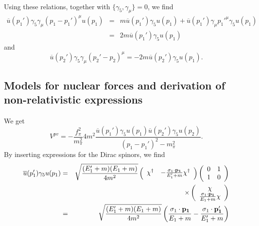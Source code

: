 \documentclass[%
twoside,                 %
final,                   %
10pt]{article}
\begin{document}
\paragraph{}
Using these relations, together with $\{\gamma_{5},\gamma_{\mu}\}=0$, we find 
\begin{eqnarray*}
\overline{u}(p_{1}')\gamma_{5}\gamma_{\mu}(p_{1}-p_{1}')^{\mu}u(p_{1})
&=&m\overline{u}(p_{1}')\gamma_{5}u(p_{1})+\overline{u}(p_{1}')\gamma_{\mu}
p_{1}'^{\mu}\gamma_{5}u(p_{1}) \nonumber \\
 &=&2m\overline{u}(p_{1}')\gamma_{5}u(p_{1}) \nonumber
\end{eqnarray*}
and 
\[
\overline{u}(p_{2}')\gamma_{5}\gamma_{\mu}(p_{2}'-p_{2})^{\mu}=
-2m\overline{u}(p_{2}')\gamma_{5}u(p_{1}).
\]



\subsection*{Models for nuclear forces and derivation of non-relativistic expressions}

\paragraph{}
We get
\[
V^{pv}=-\frac{f_{\pi}^{2}}{m_{\pi}^{2}}4m^{2}\frac{\overline{u}(p_{1}')
\gamma_{5}u(p_{1})\overline{u}(p_{2}')\gamma_{5}u(p_{2})}{(p_{1}-p_{1}')
^{2}-m_{\pi}^{2}}.
\]
By inserting expressions for the Dirac spinors, we find
\begin{eqnarray*}
\overline{u}(p_{1}')\gamma_{5}u(p_{1})&=&\sqrt{\frac{(E_{1}'+m)(E_{1}+m)}
{4m^{2}}}\left(\begin{array}{cc}\chi^{\dagger}&-\frac{\sigma_{1}\cdot{
\bf p_{1}}}{E_{1}'
+m}\chi^{\dagger}\end{array}\right)\left(\begin{array}{cc}0&1\\1&0\end{array}
\right)\nonumber \\
 &&\times \left(\begin{array}{c}\chi\\ \frac{\sigma_{1}\cdot\mathbf{p_{1}}}{E_{1}+m}\chi
\end{array}\right) 
\nonumber \\
 &=&\sqrt{\frac{(E_{1}'+m)(E_{1}+m)}{4m^{2}}}\left(\frac{\sigma_{1}\cdot
\mathbf{p_{1}}}{E_{1}+m}-\frac{\sigma_{1}\cdot\mathbf{p_{1}'}}{E_{1}'+m}\right) 
\nonumber 
\end{eqnarray*}
\end{document}
